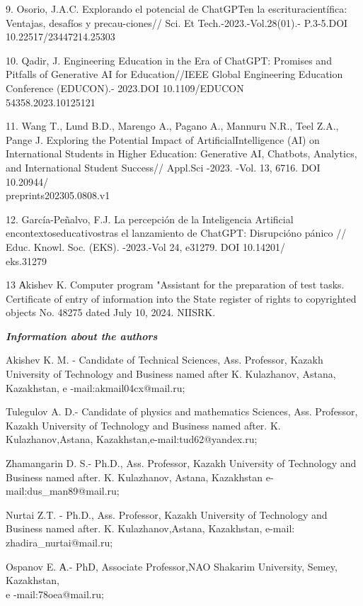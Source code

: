 \begin{noparindent}
9. Osorio, J.A.C. Explorando el potencial de ChatGPTen la
escrituracientífica: Ventajas, desafíos y precau-ciones// Sci. Et
Tech.-2023.-Vol.28(01).- P.3-5.DOI 10.22517/23447214.25303

10. Qadir, J. Engineering Education in the Era of ChatGPT: Promises and
Pitfalls of Generative AI for Education//IEEE Global Engineering
Education Conference (EDUCON).- 2023.DOI 10.1109/EDUCON\\54358.2023.10125121

11. Wang T., Lund B.D., Marengo A., Pagano A., Mannuru N.R., Teel Z.A.,
Pange J. Exploring the Potential Impact of ArtificialIntelligence (AI)
on International Students in Higher Education: Generative AI, Chatbots,
Analytics, and International Student Success// Appl.Sci -2023. -Vol. 13,
6716. DOI 10.20944/\\preprints202305.0808.v1

12. García-Peñalvo, F.J. La percepción de la Inteligencia Artificial
encontextoseducativostras el lanzamiento de ChatGPT: Disrupcióno pánico
// Educ. Knowl. Soc. (EKS). -2023.-Vol 24, e31279. DOI
10.14201/\\eks.31279

13 Аkishev K. Computer program "Assistant for the preparation of test
tasks. Certificate of entry of information into the State register of
rights to copyrighted objects No. 48275 dated July 10, 2024. NIISRK.
\end{noparindent}


\emph{{\bfseries Information about the authors}}
\begin{noparindent}

Akishev K. M. - Candidate of Technical Sciences, Ass. Professor, Kazakh
University of Technology and Business named after K. Kulazhanov, Astana,
Kazakhstan, e -mail:akmail04cx@mail.ru;

Tulegulov A. D.- Candidate of physics and mathematics Sciences, Ass.
Professor, Kazakh University of Technology and Business named after. K.
Kulazhanov,Astana, Kazakhstan,e-mail:tud62@yandex.ru;

Zhamangarin D. S.- Ph.D., Ass. Professor, Kazakh University of
Technology and Business named after. K. Kulazhanov, Astana, Kazakhstan
e-mail:dus\_man89@mail.ru;

Nurtai Z.T. - Ph.D., Ass. Professor, Kazakh University of Technology and
Business named after. K. Kulazhanov,Astana, Kazakhstan, e-mail:
zhadira\_nurtai@mail.ru;

Ospanov E. А.- PhD, Associate Professor,NAO Shakarim University, Semey,
Kazakhstan,\\ e -mail:78oea@mail.ru;
\end{noparindent}

